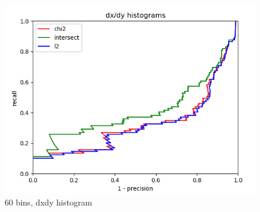 \documentclass{article}
\begin{document}
\begin{figure}[ht]
\begin{minipage}{.5\textwidth}
        \includegraphics[width=\linewidth]{images/Q4.b-dxdy_histogram_60_bins.png}
        \cprotect\caption{60 bins, dxdy histogram}
    \end{minipage}
\end{figure}
\end{document}
